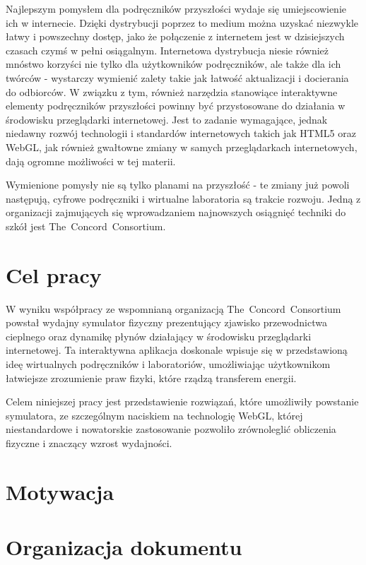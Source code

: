 Najlepszym pomysłem dla podręczników przyszłości wydaje się umiejscowienie ich w internecie. Dzięki
dystrybucji poprzez to medium można uzyskać niezwykle łatwy i powszechny dostęp, jako że połączenie
z internetem jest w dzisiejszych czasach czymś w pełni osiągalnym. Internetowa dystrybucja niesie
również mnóstwo korzyści nie tylko dla użytkowników podręczników, ale także dla ich twórców -
wystarczy wymienić zalety takie jak łatwość aktualizacji i docierania do odbiorców. W związku z tym,
również narzędzia stanowiące interaktywne elementy podręczników przyszłości powinny być
przystosowane do działania w środowisku przeglądarki internetowej. Jest to zadanie wymagające,
jednak niedawny rozwój technologii i standardów internetowych takich jak HTML5 oraz WebGL, jak
również gwałtowne zmiany w samych przeglądarkach internetowych, dają ogromne możliwości w tej
materii.

Wymienione pomysły nie są tylko planami na przyszłość - te zmiany już powoli następują, cyfrowe
podręczniki i wirtualne laboratoria są trakcie rozwoju. Jedną z organizacji zajmujących się
wprowadzaniem najnowszych osiągnięć techniki do szkół jest \mbox{The Concord Consortium}. 

\section{Cel pracy}
\label{sec:celPracy}

W wyniku współpracy ze wspomnianą organizacją \mbox{The Concord Consortium} powstał wydajny
symulator fizyczny prezentujący zjawisko przewodnictwa cieplnego oraz dynamikę płynów działający w
środowisku przeglądarki internetowej. Ta interaktywna aplikacja doskonale wpisuje się w
przedstawioną ideę wirtualnych podręczników i laboratoriów, umożliwiając użytkownikom łatwiejsze
zrozumienie praw fizyki, które rządzą transferem energii.

Celem niniejszej pracy jest przedstawienie rozwiązań, które umożliwiły powstanie symulatora, ze
szczególnym naciskiem na technologię WebGL, której niestandardowe i nowatorskie zastosowanie
pozwoliło zrównoleglić obliczenia fizyczne i znaczący wzrost wydajności.

\section{Motywacja}
\label{sec:motywacja}


\section{Organizacja dokumentu}
\label{sec:organizacjaDokumentu}

